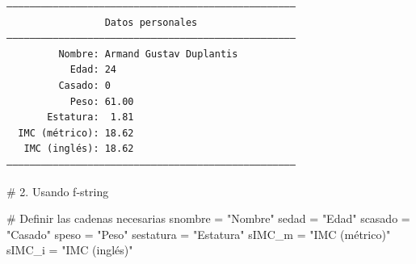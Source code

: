 \documentclass[
  spanish,
  letterpaper,
]{scrbook}
\newenvironment{Shaded}{\begin{snugshade}}{\end{snugshade}}
\newcommand{\CommentTok}[1]{\textcolor[rgb]{0.37,0.37,0.37}{#1}}
\newcommand{\NormalTok}[1]{\textcolor[rgb]{0.00,0.23,0.31}{#1}}
\newcommand{\OperatorTok}[1]{\textcolor[rgb]{0.37,0.37,0.37}{#1}}
\newcommand{\StringTok}[1]{\textcolor[rgb]{0.13,0.47,0.30}{#1}}
\theoremstyle{definition}
\theoremstyle{remark}
\begin{document}
\begin{verbatim}
――――――――――――――――――――――――――――――――――――――――――――――――――
                 Datos personales                 
――――――――――――――――――――――――――――――――――――――――――――――――――
         Nombre: Armand Gustav Duplantis
           Edad: 24
         Casado: 0
           Peso: 61.00
       Estatura:  1.81
  IMC (métrico): 18.62
   IMC (inglés): 18.62
――――――――――――――――――――――――――――――――――――――――――――――――――
\end{verbatim}

\begin{Shaded}
\begin{Highlighting}[]
\CommentTok{\# 2. Usando f{-}string}

\CommentTok{\# Definir las cadenas necesarias}
\NormalTok{snombre }\OperatorTok{=} \StringTok{"Nombre"}
\NormalTok{sedad }\OperatorTok{=} \StringTok{"Edad"}
\NormalTok{scasado }\OperatorTok{=} \StringTok{"Casado"}
\NormalTok{speso }\OperatorTok{=} \StringTok{"Peso"}
\NormalTok{sestatura }\OperatorTok{=} \StringTok{"Estatura"}
\NormalTok{sIMC\_m }\OperatorTok{=} \StringTok{"IMC (métrico)"}
\NormalTok{sIMC\_i }\OperatorTok{=} \StringTok{"IMC (inglés)"}
\end{Highlighting}
\end{Shaded}
\end{document}
